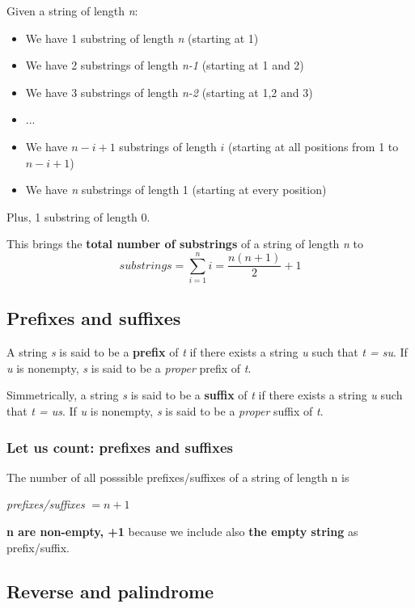 \documentclass[12pt, letterpaper]{article}
\begin{document}
Given a string of length \emph{n}:

\begin{itemize}
\item We have 1 substring of length \emph{n} (starting at 1)
\item We have 2 substrings of length \emph{n-1} (starting at 1 and 2)
\item We have 3 substrings of length \emph{n-2} (starting at 1,2 and 3)
\item ...
\item We have $n-i+1$ substrings of length $i$ (starting at all positions from 1 to $n-i+1$)
\item We have \emph{n} substrings of length 1 (starting at every position)
\end{itemize}

Plus, 1 substring of length 0.

This brings the \textbf{total number of substrings} of a string of length \emph{n} to
$$
substrings = \sum^n_{i=1}i=\frac{n(n+1)}{2}+1
$$

\subsection{Prefixes and suffixes}

A string \emph{s} is said to be a \textbf{prefix} of \emph{t} if there exists a string \emph{u} such that \emph{t = su}. If \emph{u} is nonempty, \emph{s} is said to be a \emph{proper} prefix of \emph{t}.

Simmetrically, a string \emph{s} is said to be a \textbf{suffix} of \emph{t} if there exists a string \emph{u} such that \emph{t = us}. If \emph{u} is nonempty, \emph{s} is said to be a \emph{proper} suffix of \emph{t}.

\subsubsection{Let us count: prefixes and suffixes}

The number of all posssible prefixes/suffixes of a string of length n is
\begin{center}
\emph{prefixes/suffixes} $= n + 1$
\end{center}

\textbf{n are non-empty, +1} because we include also \textbf{the empty string} as prefix/suffix.

\subsection{Reverse and palindrome}
\end{document}
